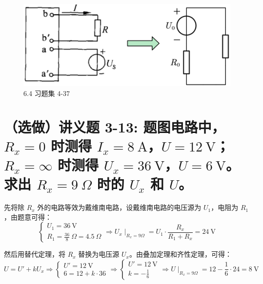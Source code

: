 \documentclass[UTF8]{report}
\theoremstyle{MyLineTheoremStyle} %
\theoremstyle{MyBlockTheoremStyle} %
\theoremstyle{MySubsubsectionStyle} %
\begin{document}
\begin{figure}[H]\centering
\includegraphics[width=0.52\columnwidth]{assets/6/0f2c149b099f73467b72503826e5385d.png}
\caption{ 6.4 习题集 4-37}\label{6.4 习题集 4-37}
\end{figure}

\section{（选做）讲义题 3-13: 题图电路中，$R_x = 0$ 时测得 $I_x = 8 \ \mathrm{A}$，$U = 12 \ \mathrm{V}$；$R_x = \infty$ 时测得 $U_x = 36 \ \mathrm{V}$，$U = 6 \ \mathrm{V}$。求出 $R_x = 9 \ \Omega$ 时的 $U_x$ 和 $U$。}

先将除 $R_x$ 外的电路等效为戴维南电路，设戴维南电路的电压源为 $U_1$，电阻为 $R_1$，由题意可得：
\begin{equation}
\begin{cases}
    U_1 = 36 \ \mathrm{V} \\ 
    R_1 = \frac{36}{8} \ \Omega = 4.5 \ \Omega
\end{cases}
\Longrightarrow 
\boxed{
    U_x \mid_{R_x = 9 \Omega} = U_1 \cdot \frac{R_x}{R_1 + R_x} = 24 \ \mathrm{V}
}
\end{equation}

然后用替代定理，将 $R_x$ 替换为电压源 $U_x$。由叠加定理和齐性定理，可得：
\begin{equation}
    U = U' + kU_x
    \Longrightarrow 
\begin{cases}
    U' = 12 \ \mathrm{V} \\ 
    6 = 12 + k \cdot 36
\end{cases}
\Longrightarrow 
\begin{cases}
    U' = 12 \ \mathrm{V} \\ 
    k = -\frac{1}{6}
\end{cases}
\Longrightarrow 
\boxed{
    U\mid_{R_x = 9 \Omega} = 12 - \frac{1}{6} \cdot 24 = 8 \ \mathrm{V}
}
\end{equation}
\end{document}
